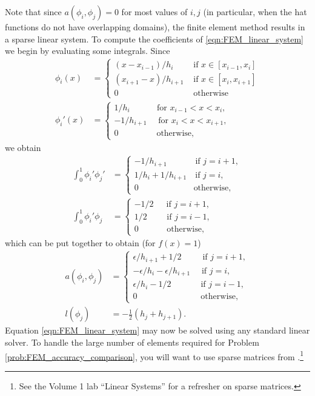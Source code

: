 Note that since $a(\phi_i,\phi_j) = 0$ for most values of $i, j$ (in particular, when the hat functions do not have overlapping domains), the finite element method results in a sparse linear system.
To compute the coefficients of \eqref{eqn:FEM_linear_system} we begin by evaluating some integrals.
Since
\begin{align*}
\phi_i(x) &= \begin{cases}
(x - x_{i-1})/h_i &\text{ if } x \in [x_{i-1},x_i]\\
 (x_{i+1} - x)/h_{i+1}  &\text{ if } x \in [x_{i},x_{i+1}]\\
0 &\text{ otherwise}
\end{cases}
\\
\phi_i'(x) &= \begin{cases}
1/h_i \quad \quad \quad \, \text{for } x_{i-1} < x < x_i,\\
 -1/h_{i+1} \quad \text{ for } x_{i} < x < x_{i+1},\\
0 \quad \quad \quad \quad \, \text{ otherwise},
\end{cases}
\end{align*}
we obtain
\begin{align*}
\int_0^1  \phi_i'\phi_j' &= \begin{cases}
- 1/h_{i+1} \quad \quad \quad \text{ if } j=i+1,\\
1/h_i + 1/h_{i+1} \quad \text{if } j=i,\\
0 \quad \quad \quad \quad \quad \quad \, \text{ otherwise},
\end{cases} \\
\int_0^1  \phi_i'\phi_j &= \begin{cases}
- 1/2 \quad \,\text{ if } j=i+1,\\
1/2 \quad \quad \text{ if } j=i-1,\\
0 \quad \quad \quad \text{ otherwise},
\end{cases}
\end{align*}
which can be put together to obtain (for \(f(x)=1\))
\begin{align}
a(\phi_i,\phi_j) &= \begin{cases}
\epsilon/h_{i+1} + 1/2 \quad \quad \, \text{ if } j=i+1,\\
-\epsilon/h_i -\epsilon/h_{i+1} \quad  \text{ if } j=i,\\
\epsilon/h_i - 1/2 \quad \quad \quad \, \text{ if } j=i-1,\\
0 \quad \quad \quad \quad \quad \quad \,\,\,\,\,\,\, \text{ otherwise},
\end{cases}
\label{eqn:FEM:a_definition}
\\
l(\phi_j) &= -\frac{1}{2}(h_j + h_{j+1}).
\label{eqn:FEM:l_definition}
\end{align}
Equation \eqref{eqn:FEM_linear_system} may now be solved using any standard linear solver.
To handle the large number of elements required for Problem \ref{prob:FEM_accuracy_comparison}, you will want to use sparse matrices from .\footnote{See the Volume 1 lab ``Linear Systems'' for a refresher on sparse matrices.}

